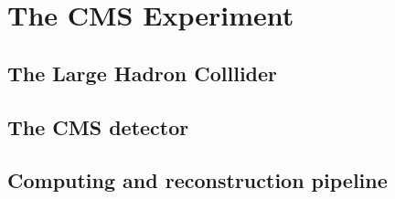 \chapter{The CMS Experiment}

\section{The Large Hadron Colllider}

\section{The CMS detector}

\section{Computing and reconstruction pipeline}
